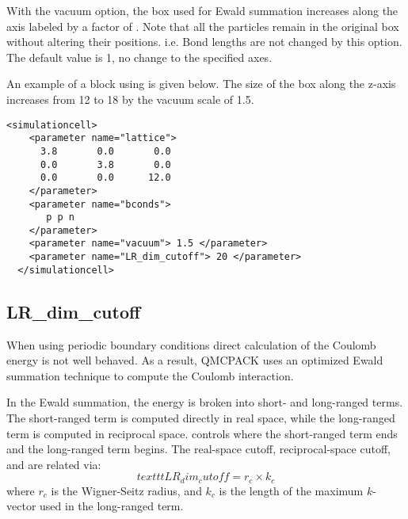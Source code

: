 With the vacuum option, the box used for Ewald summation increases along the axis labeled  by a factor of .
Note that all the particles remain in the original box without altering their positions. i.e. Bond lengths are not changed by this option.
The default value is 1, no change to the specified axes.

An example of a  block using  is given below.
The size of the box along the z-axis increases from 12 to 18 by the vacuum scale of 1.5.
\begin{lstlisting}[style=QMCPXML]
  <simulationcell>
    <parameter name="lattice">
      3.8       0.0       0.0
      0.0       3.8       0.0
      0.0       0.0      12.0
    </parameter>
    <parameter name="bconds">
       p p n
    </parameter>
    <parameter name="vacuum"> 1.5 </parameter>
    <parameter name="LR_dim_cutoff"> 20 </parameter>
  </simulationcell>
\end{lstlisting}

\subsection{LR\_dim\_cutoff}
When using periodic boundary conditions direct calculation of the Coulomb energy is
not well behaved. As a result, QMCPACK uses an optimized Ewald summation technique
to compute the Coulomb interaction.\cite{Natoli1995}

In the Ewald summation, the energy is broken into short- and long-ranged terms.
The short-ranged term is computed directly in real space, while the long-ranged term is computed in reciprocal space.
 controls where the short-ranged term ends and the long-ranged term begins.
The real-space cutoff, reciprocal-space cutoff, and  are related via:
\[
texttt{LR_dim_cutoff} = r_{c} \times k_{c}
\]
where $r_{c}$ is the Wigner-Seitz radius, and $k_{c}$ is the length of the maximum $k$-vector used in the long-ranged term.
